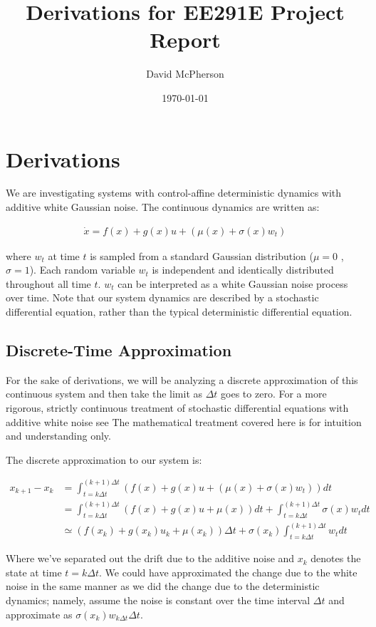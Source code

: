 \documentclass[a4paper]{article}
\title{Derivations for EE291E Project Report}
\author{David McPherson}
\date{\today}
\begin{document}
\section{Derivations}
We are investigating systems with control-affine deterministic dynamics with additive white Gaussian noise.
The continuous dynamics are written as:

\begin{align}
\dot{x} = f(x) + g(x) u + (\mu(x) + \sigma(x) w_t)
\end{align}

where $w_t$ at time $t$ is sampled from a standard Gaussian distribution ($\mu = 0$ , $\sigma = 1$).
Each random variable $w_t$ is independent and identically distributed throughout all time $t$.
$w_t$ can be interpreted as a white Gaussian noise process over time.
Note that our system dynamics are described by a stochastic differential equation, rather than the typical deterministic differential equation.

\subsection{Discrete-Time Approximation}
For the sake of derivations, we will be analyzing a discrete approximation of this continuous system and then take the limit as $\Delta t$ goes to zero.
For a more rigorous, strictly continuous treatment of stochastic differential equations with additive white noise see %
The mathematical treatment covered here is for intuition and understanding only.

The discrete approximation to our system is:

\begin{align}
x_{k+1} - x_k &= \int_{t = k \Delta t}^{(k+1) \Delta t} (f(x) + g(x) u + (\mu(x) + \sigma(x) w_t) )dt
  \\  &= \int_{t = k \Delta t}^{(k+1) \Delta t} (f(x) + g(x) u + \mu(x)) dt + \int_{t = k \Delta t}^{(k+1) \Delta t} \sigma(x) w_t dt
\\ &\simeq (f(x_k) + g(x_k) u_k + \mu(x_k)) \Delta t + \sigma(x_k) \int_{t = k \Delta t}^{(k+1) \Delta t} w_t dt
\end{align}

Where we've separated out the drift due to the additive noise and $x_k$ denotes the state at time $t = k \Delta t$.
We could have approximated the change due to the white noise in the same manner as we did the change due to the deterministic dynamics;
namely, assume the noise is constant over the time interval $\Delta t$ and approximate as $\sigma(x_k) w_{k \Delta t} \Delta t$.
\end{document}
